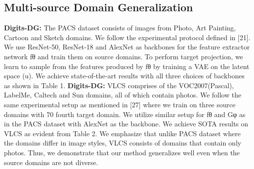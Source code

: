 \documentclass[review]{cvpr}
\begin{document}
\subsection{Multi-source Domain Generalization}
\textbf{Digits-DG:} The PACS dataset consists of images from Photo,
Art Painting, Cartoon and Sketch domains. We follow the
experimental protocol defined in [21]. We use ResNet-50,
ResNet-18 and AlexNet as backbones for the feature extractor network fθ and train them on source domains. To perform target projection, we learn to sample from the features
produced by fθ by training a VAE on the latent space (u).
We achieve state-of-the-art results with all three choices of
backbones as shown in Table 1.
\textbf{Digits-DG:} VLCS comprises of the VOC2007(Pascal),
LabelMe, Caltech and Sun domains, all of which contain
photos. We follow the same experimental setup as mentioned in [27] where we train on three source domains with
70%
fourth target domain. We utilize similar setup for fθ and Gφ
as in the PACS dataset with AlexNet as the backbone. We
achieve SOTA results on VLCS as evident from Table 2. We
emphasize that unlike PACS dataset where the domains differ in image styles, VLCS consists of domains that contain
only photos. Thus, we demonstrate that our method generalizes well even when the source domains are not diverse.
\end{document}
